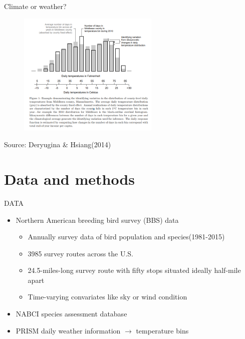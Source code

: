 \documentclass[handout]{beamer}
\begin{document}
\begin{frame}{Climate or weather?}
  \begin{figure}[h]
  \centering
  \includegraphics[width=0.6\textwidth]{climate_weather.png}
  \end{figure}
  Source: Deryugina \& Hsiang(2014)
\end{frame}



\section{Data and methods}
\begin{frame}{DATA}
  \begin{itemize}
    \item Northern American breeding bird survey (BBS) data
    \hyperlink{BBS routes}{}
    \begin{itemize}
      \item
      Annually survey data of bird population and species(1981-2015)
      \item
      3985 survey routes across the U.S.
      \item
      24.5-miles-long survey route with fifty stops situated ideally half-mile apart
      \item
      Time-varying convariates like sky or wind condition
    \end{itemize}
    \item NABCI species assessment database
    \item PRISM daily weather information $\rightarrow$ temperature bins
    \hyperlink{Temperature bins}{}
  \end{itemize}
\end{frame}
\end{document}
